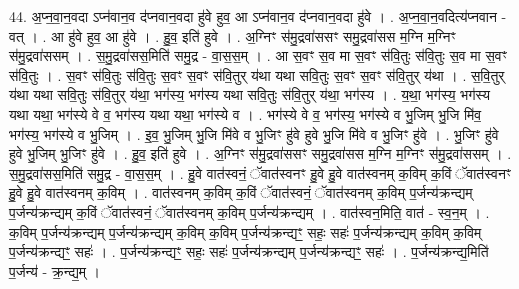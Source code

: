 \documentclass[17pt]{extarticle}
\begin{document}
44. अ॒प्न॒वा॒न॒वदा ऽप्न॑वान॒व द॑प्नवान॒वदा हु॑वे हुव॒ आ ऽप्न॑वान॒व द॑प्नवान॒वदा हु॑वे । . अ॒प्न॒वा॒न॒वदित्य॑प्नवान - वत् । . आ हु॑वे हुव॒ आ हु॑वे । . हु॒व॒ इति॑ हुवे । . अ॒ग्निꣳ स॑मु॒द्रवा॑ससꣳ समु॒द्रवा॑सस म॒ग्नि म॒ग्निꣳ स॑मु॒द्रवा॑ससम् । . स॒मु॒द्रवा॑सस॒मिति॑ समु॒द्र - वा॒स॒स॒म् । . आ स॒वꣳ स॒व मा स॒वꣳ स॑वि॒तुः स॑वि॒तुः स॒व मा स॒वꣳ स॑वि॒तुः । . स॒वꣳ स॑वि॒तुः स॑वि॒तुः स॒वꣳ स॒वꣳ स॑वि॒तुर् य॑था यथा सवि॒तुः स॒वꣳ स॒वꣳ स॑वि॒तुर् य॑था । . स॒वि॒तुर् य॑था यथा सवि॒तुः स॑वि॒तुर् य॑था॒ भग॑स्य॒ भग॑स्य यथा सवि॒तुः स॑वि॒तुर् य॑था॒ भग॑स्य । . य॒था॒ भग॑स्य॒ भग॑स्य यथा यथा॒ भग॑स्ये वे व॒ भग॑स्य यथा यथा॒ भग॑स्ये व । . भग॑स्ये वे व॒ भग॑स्य॒ भग॑स्ये व भु॒जिम् भु॒जि मि॑व॒ भग॑स्य॒ भग॑स्ये व भु॒जिम् । . इ॒व॒ भु॒जिम् भु॒जि मि॑वे व भु॒जिꣳ हु॑वे हुवे भु॒जि मि॑वे व भु॒जिꣳ हु॑वे । . भु॒जिꣳ हु॑वे हुवे भु॒जिम् भु॒जिꣳ हु॑वे । . हु॒व॒ इति॑ हुवे । . अ॒ग्निꣳ स॑मु॒द्रवा॑ससꣳ समु॒द्रवा॑सस म॒ग्नि म॒ग्निꣳ स॑मु॒द्रवा॑ससम् । . स॒मु॒द्रवा॑सस॒मिति॑ समु॒द्र - वा॒स॒स॒म् । . हु॒वे वात॑स्वनं॒ ॅवात॑स्वनꣳ हु॒वे हु॒वे वात॑स्वनम् क॒विम् क॒विं ॅवात॑स्वनꣳ हु॒वे हु॒वे वात॑स्वनम् क॒विम् । . वात॑स्वनम् क॒विम् क॒विं ॅवात॑स्वनं॒ ॅवात॑स्वनम् क॒विम् प॒र्जन्य॑क्रन्द्यम् प॒र्जन्य॑क्रन्द्यम् क॒विं ॅवात॑स्वनं॒ ॅवात॑स्वनम् क॒विम् प॒र्जन्य॑क्रन्द्यम् । . वात॑स्वन॒मिति॒ वात॑ - स्व॒न॒म् । . क॒विम् प॒र्जन्य॑क्रन्द्यम् प॒र्जन्य॑क्रन्द्यम् क॒विम् क॒विम् प॒र्जन्य॑क्रन्द्यꣳ॒॒ सहः॒ सहः॑ प॒र्जन्य॑क्रन्द्यम् क॒विम् क॒विम् प॒र्जन्य॑क्रन्द्यꣳ॒॒ सहः॑ । . प॒र्जन्य॑क्रन्द्यꣳ॒॒ सहः॒ सहः॑ प॒र्जन्य॑क्रन्द्यम् प॒र्जन्य॑क्रन्द्यꣳ॒॒ सहः॑ । . प॒र्जन्य॑क्रन्द्य॒मिति॑ प॒र्जन्य॑ - क्र॒न्द्य॒म् । \newline
\end{document}
